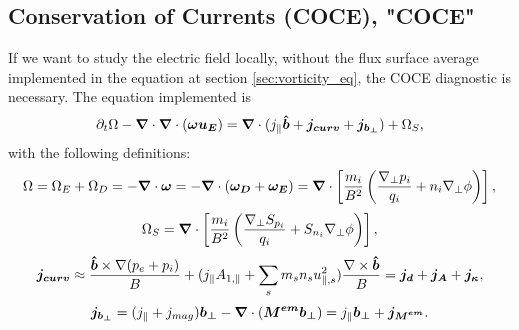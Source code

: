 \subsection{Conservation of Currents (COCE), "COCE"}\label{sec:COCE}
If we want to study the electric field locally, without the flux surface average implemented in the equation at section \ref{sec:vorticity_eq}, the COCE diagnostic is necessary. The equation implemented is 
\begin{equation}
    \partial_t\Omega-{\boldsymbol{\nabla}}\cdot{\boldsymbol{\nabla}}\cdot(\boldsymbol{\omega u_E})={\boldsymbol{\nabla}}\cdot(j_\parallel\bm{\hat{b}}+\boldsymbol{j_{curv}}+\boldsymbol{j_{b_\perp}})+\Omega_S,
    \label{eq:COCE_diagnostic}
\end{equation}   
with the following definitions:
\begin{equation}
\Omega=\Omega_E+\Omega_D=-{\boldsymbol{\nabla}}\cdot\boldsymbol{\omega}=-{\boldsymbol{\nabla}}\cdot(\boldsymbol{\omega_D}+\boldsymbol{\omega_E})={\boldsymbol{\nabla}}\cdot\left[\frac{m_i}{B^2}\left(\frac{\nabla_\perp p_i}{q_i}+n_i\nabla_\perp\phi\right)\right],
\end{equation}
\begin{equation}
    \Omega_S={\boldsymbol{\nabla}}\cdot\left[\frac{m_i}{B^2}\left(\frac{\nabla_\perp S_{p_i}}{q_i}+S_{n_i}\nabla_\perp\phi\right)\right],
\end{equation}
\begin{equation}
     \boldsymbol{j_{curv}}\approx\frac{\bm{\hat{b}}\times\nabla(p_e+p_i)}{B}+(j_\parallel A_{1,\parallel}+\sum_s m_s n_s u_{\parallel,s}^2) \frac{\nabla\times\bm{\hat{b}}}{B}=\boldsymbol{j_{d}}+\boldsymbol{j_A}+\boldsymbol{j_\kappa},
\end{equation}
\begin{equation}
      \boldsymbol{j_{b_\perp}}=(j_\parallel+j_{mag})\boldsymbol{b_\perp}-{\boldsymbol{\nabla}}\cdot(\boldsymbol{M^{em}}\boldsymbol{b_\perp})=j_\parallel\boldsymbol{b_\perp}+\boldsymbol{j_{M^{em}}}.
\end{equation}

